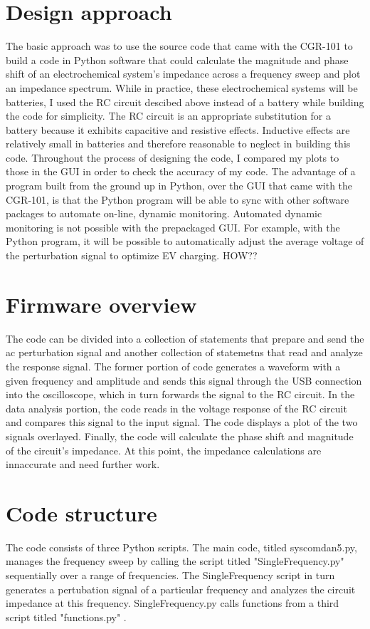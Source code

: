 	\section{Design approach}
The basic approach was to use the source code that came with the CGR-101 to build a code in Python software that could calculate the magnitude and phase shift of an electrochemical system's impedance across a frequency sweep and plot an impedance spectrum. While in practice, these electrochemical systems will be batteries, I used the RC circuit descibed above instead of a battery while building the code for simplicity. The RC circuit is an appropriate substitution for a battery because it exhibits capacitive and resistive effects. Inductive effects are relatively small in batteries and therefore reasonable to neglect in building this code. Throughout the process of designing the code, I compared my plots to those in the GUI in order to check the accuracy of my code. The advantage of a program built from the ground up in Python, over the GUI that came with the CGR-101, is that the Python program will be able to sync with other software packages to automate on-line, dynamic monitoring. Automated dynamic monitoring is not possible with the prepackaged GUI. For example, with the Python program, it will be possible to automatically adjust the average voltage of the perturbation signal to optimize EV charging. HOW??\newline
	\section{Firmware overview}
The code can be divided into a collection of statements that prepare and send the ac perturbation signal and another collection of statemetns that read and analyze the response signal. The former portion of  code generates a waveform with a given frequency and amplitude and sends this signal through the USB connection into the oscilloscope, which in turn forwards the signal to the RC circuit. In the data analysis portion, the code reads in the voltage response of the RC circuit and compares this signal to the input signal. The code displays a plot of the two signals overlayed. Finally, the code will calculate the phase shift and magnitude of the circuit's impedance. At this point, the impedance calculations are innaccurate and need further work.

\section{Code structure}
The code consists of three Python scripts. The main code, titled syscomdan5.py, manages the frequency sweep by calling the script titled "SingleFrequency.py" sequentially over a range of frequencies. The SingleFrequency script in turn generates a pertubation signal of a particular frequency and analyzes the circuit impedance at this frequency. SingleFrequency.py calls functions from a third script titled "functions.py" .

